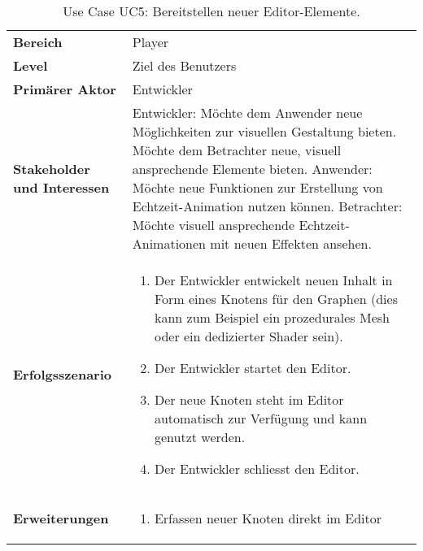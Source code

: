 
\begin{table}[H]
    \centering
    \caption{Use Case UC5: Bereitstellen neuer Editor-Elemente.}\label{table:uc1-user}
    \begin{tabular}{p{}p{}}
        \toprule
            \textbf{Bereich} &
            Player\\
        \cmidrule(r){1-1}\cmidrule(lr){2-2}
            \textbf{Level} &
            Ziel des Benutzers \\
        \cmidrule(r){1-1}\cmidrule(lr){2-2}
            \textbf{Primärer Aktor} &
            Entwickler \\
        \cmidrule(r){1-1}\cmidrule(lr){2-2}
            \textbf{Stakeholder und Interessen} &
            Entwickler: Möchte dem Anwender neue Möglichkeiten zur visuellen
            Gestaltung bieten. Möchte dem Betrachter neue, visuell ansprechende
            Elemente bieten. \newline
            Anwender: Möchte neue Funktionen zur Erstellung von
            Echtzeit-Animation nutzen können. \newline
            Betrachter: Möchte visuell ansprechende Echtzeit-Animationen mit
            neuen Effekten ansehen. \\
        \cmidrule(r){1-1}\cmidrule(lr){2-2}
            \textbf{Erfolgsszenario} &
            \begin{enumerate}
                \item{Der Entwickler entwickelt neuen Inhalt in Form eines
                        Knotens für den Graphen (dies kann zum Beispiel ein
                        prozedurales Mesh oder ein dedizierter Shader sein).}
                \item{Der Entwickler startet den Editor.}
                \item{Der neue Knoten steht im Editor automatisch zur Verfügung
                        und kann genutzt werden.}
                \item{Der Entwickler schliesst den Editor.}
            \end{enumerate} \\
        \cmidrule(r){1-1}\cmidrule(lr){2-2}
            \textbf{Erweiterungen} &
            \begin{enumerate}[label= (\alph*)]
                \item{Erfassen neuer Knoten direkt im Editor
}
\end{enumerate}
\end{tabular}
\end{table}
